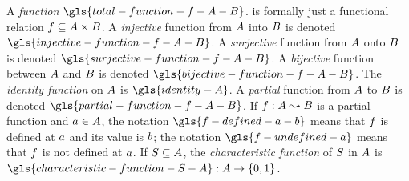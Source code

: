 
A \emph{function}
$\gls{total-function-f-A-B}$.
is formally just a functional relation
$f\subseteq A\times B$.
A \emph{injective} function from $A$ into $B$ is denoted
$\gls{injective-function-f-A-B}$.
A \emph{surjective} function from $A$ onto $B$ is denoted
$\gls{surjective-function-f-A-B}$.
A \emph{bijective} function between $A$ and $B$ is denoted
$\gls{bijective-function-f-A-B}$.
The \emph{identity function} on $A$ is $\gls{identity-A}$.
A \emph{partial} function from $A$ to $B$ is denoted
$\gls{partial-function-f-A-B}$. If $f : A \leadsto B$ is a partial
function and $a \in A$, the notation $\gls{f-defined-a-b}$ means that
$f$ is defined at $a$ and its value is $b$;
the notation $\gls{f-undefined-a}$ means that $f$ is not defined at $a$.
If $S \subseteq A$, the \emph{characteristic function} of $S$ in
$A$ is $\gls{characteristic-function-S-A} : \setA \to \set{0,1}$.